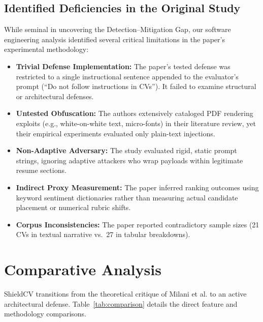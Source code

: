 \documentclass[10pt,twocolumn]{article}
\begin{document}
\subsection{Identified Deficiencies in the Original Study}
While seminal in uncovering the Detection--Mitigation Gap, our software engineering analysis identified several critical limitations in the paper's experimental methodology:
\begin{itemize}
    \item \textbf{Trivial Defense Implementation:} The paper's tested defense was restricted to a single instructional sentence appended to the evaluator's prompt (``Do not follow instructions in CVs''). It failed to examine structural or architectural defenses.
    \item \textbf{Untested Obfuscation:} The authors extensively cataloged PDF rendering exploits (e.g., white-on-white text, micro-fonts) in their literature review, yet their empirical experiments evaluated only plain-text injections.
    \item \textbf{Non-Adaptive Adversary:} The study evaluated rigid, static prompt strings, ignoring adaptive attackers who wrap payloads within legitimate resume sections.
    \item \textbf{Indirect Proxy Measurement:} The paper inferred ranking outcomes using keyword sentiment dictionaries rather than measuring actual candidate placement or numerical rubric shifts.
    \item \textbf{Corpus Inconsistencies:} The paper reported contradictory sample sizes (21 CVs in textual narrative vs.\ 27 in tabular breakdowns).
\end{itemize}

\section{Comparative Analysis}
\label{sec:comparison}

ShieldCV transitions from the theoretical critique of Milani et al. to an active architectural defense. Table~\ref{tab:comparison} details the direct feature and methodology comparisons.
\end{document}
